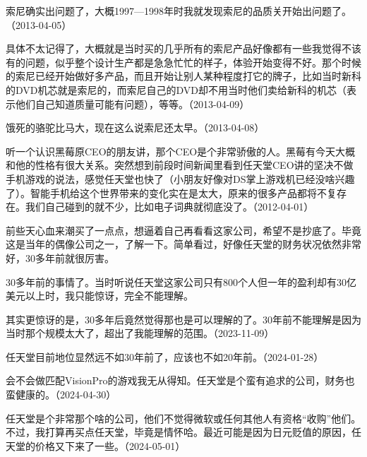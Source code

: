 
索尼确实出问题了，大概1997—1998年时我就发现索尼的品质关开始出问题了。（2013-04-05）


具体不太记得了，大概就是当时买的几乎所有的索尼产品好像都有一些我觉得不该有的问题，似乎整个设计生产都是急急忙忙的样子，体验开始变得不好。那个时候的索尼已经开始做好多产品，而且开始让别人某种程度打它的牌子，比如当时新科的DVD机芯就是索尼的，而索尼自己的DVD却不用当时他们卖给新科的机芯（表示他们自己知道质量可能有问题），等等。（2013-04-09）


饿死的骆驼比马大，现在这么说索尼还太早。（2013-04-08）


听一个认识黑莓原CEO的朋友讲，那个CEO是个非常骄傲的人。黑莓有今天大概和他的性格有很大关系。突然想到前段时间新闻里看到任天堂CEO讲的坚决不做手机游戏的说法，感觉任天堂也快了（小朋友好像对DS掌上游戏机已经没啥兴趣了）。智能手机给这个世界带来的变化实在是太大，原来的很多产品都将不复存在。我们自己碰到的就不少，比如电子词典就彻底没了。（2012-04-01）

前些天心血来潮买了一点点，想逼着自己再看看这家公司，希望不是抄底了。毕竟这是当年的偶像公司之一，了解一下。简单看过，好像任天堂的财务状况依然非常好，30多年前就很厉害。


30多年前的事情了。当时听说任天堂这家公司只有800个人但一年的盈利却有30亿美元以上时，我只能惊讶，完全不能理解。

其实更惊讶的是，30多年后竟然觉得那也是可以理解的了。30年前不能理解是因为当时那个规模太大了，超出了我能理解的范围。（2023-11-09）

任天堂目前地位显然远不如30年前了，应该也不如20年前。（2024-01-28）


会不会做匹配VisionPro的游戏我无从得知。任天堂是个蛮有追求的公司，财务也蛮健康的。（2024-04-30）

任天堂是个非常那个啥的公司，他们不觉得微软或任何其他人有资格“收购”他们。不过，我打算再买点任天堂，毕竟是情怀哈。最近可能是因为日元贬值的原因，任天堂的价格又下来了一些。（2024-05-01）

